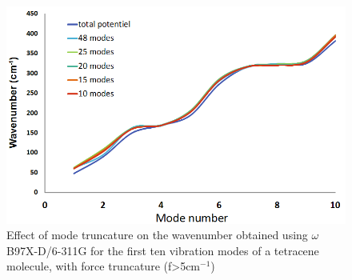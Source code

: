  \begin{figure}[h]
 	\centering
 	\includegraphics[scale=0.8]{image/mode-trunc}
 	\caption[Effect of mode truncature on the first ten mode on wavenumber of tetracene ]{Effect of mode truncature on the wavenumber obtained using $\omega$B97X-D/6-311G for the first ten vibration modes of a tetracene molecule, with force truncature (f>5cm$^{-1}$)}
 \end{figure}
 
